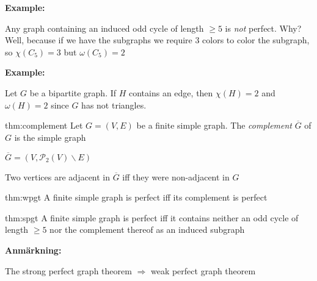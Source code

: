 \par\bigskip
\noindent\textbf{Example:}\par
\noindent Any graph containing an induced odd cycle of length $\geq5$ is \textit{not} perfect. Why? Well, because if we have the subgraphs we require 3 colors to color the subgraph, so $\chi(C_5) =3$ but $\omega(C_5)=2$ 
\par\bigskip
\noindent\textbf{Example:}\par
\noindent Let $G$ be a bipartite graph. If $H$ contains an edge, then $\chi(H) = 2$  and $\omega(H) = 2$ since $G$ has not triangles.
\par\bigskip
\begin{theo}[Complement]{thm:complement}
  Let $G = (V,E)$ be a finite simple graph. The \textit{complement} $\overline{G}$ of $G$ is the simple graph\par\noindent$\overline{G} = (V,\mathcal{P}_2(V)\backslash E)$
  \par\bigskip
  \noindent Two vertices are adjacent in $\overline{G}$ iff they were non-adjacent in $G$
\end{theo}
\par\bigskip
\begin{theo}{thm:wpgt}
  A finite simple graph is perfect iff its complement is perfect
\end{theo}
\newpage
\begin{theo}{thm:spgt}
  A finite simple graph is perfect iff it contains neither an odd cycle of length $\geq5$ nor the complement thereof as an induced subgraph
\end{theo}
\par\bigskip
\noindent\textbf{Anmärkning:}\par
\noindent The strong perfect graph theorem $\Rightarrow$ weak perfect graph theorem

